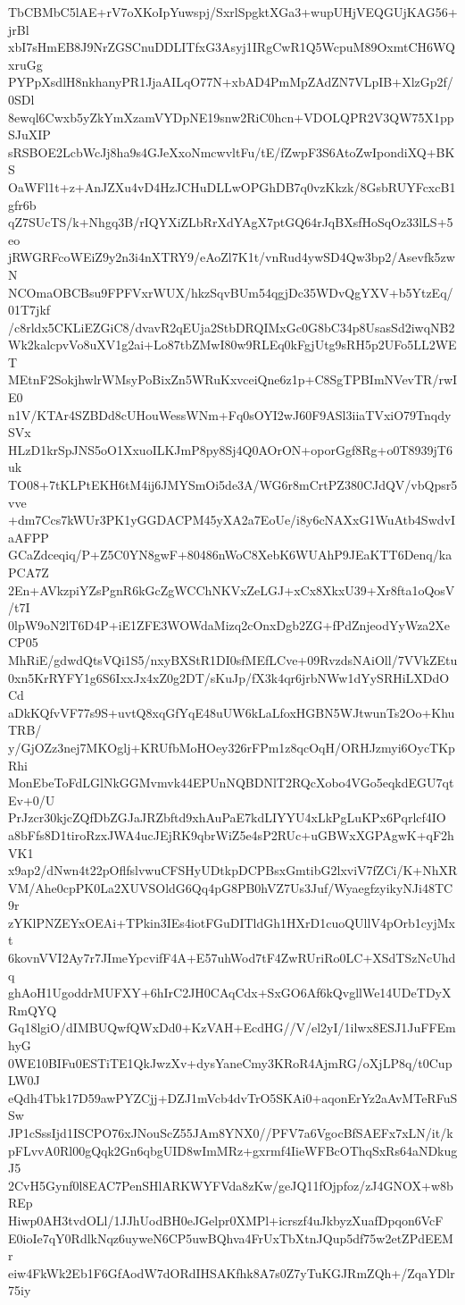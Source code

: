 TbCBMbC5lAE+rV7oXKoIpYuwspj/SxrlSpgktXGa3+wupUHjVEQGUjKAG56+jrBl
xbI7sHmEB8J9NrZGSCnuDDLITfxG3Asyj1IRgCwR1Q5WcpuM89OxmtCH6WQxruGg
PYPpXsdlH8nkhanyPR1JjaAILqO77N+xbAD4PmMpZAdZN7VLpIB+XlzGp2f/0SDl
8ewql6Cwxb5yZkYmXzamVYDpNE19snw2RiC0hcn+VDOLQPR2V3QW75X1ppSJuXIP
sRSBOE2LcbWcJj8ha9s4GJeXxoNmcwvltFu/tE/fZwpF3S6AtoZwIpondiXQ+BKS
OaWFl1t+z+AnJZXu4vD4HzJCHuDLLwOPGhDB7q0vzKkzk/8GsbRUYFcxcB1gfr6b
qZ7SUcTS/k+Nhgq3B/rIQYXiZLbRrXdYAgX7ptGQ64rJqBXsfHoSqOz33lLS+5eo
jRWGRFcoWEiZ9y2n3i4nXTRY9/eAoZl7K1t/vnRud4ywSD4Qw3bp2/Asevfk5zwN
NCOmaOBCBsu9FPFVxrWUX/hkzSqvBUm54qgjDc35WDvQgYXV+b5YtzEq/01T7jkf
/c8rldx5CKLiEZGiC8/dvavR2qEUja2StbDRQIMxGc0G8bC34p8UsasSd2iwqNB2
Wk2kalcpvVo8uXV1g2ai+Lo87tbZMwI80w9RLEq0kFgjUtg9sRH5p2UFo5LL2WET
MEtnF2SokjhwlrWMsyPoBixZn5WRuKxvceiQne6z1p+C8SgTPBImNVevTR/rwIE0
n1V/KTAr4SZBDd8cUHouWessWNm+Fq0sOYI2wJ60F9ASl3iiaTVxiO79TnqdySVx
HLzD1krSpJNS5oO1XxuoILKJmP8py8Sj4Q0AOrON+oporGgf8Rg+o0T8939jT6uk
TO08+7tKLPtEKH6tM4ij6JMYSmOi5de3A/WG6r8mCrtPZ380CJdQV/vbQpsr5vve
+dm7Ccs7kWUr3PK1yGGDACPM45yXA2a7EoUe/i8y6cNAXxG1WuAtb4SwdvIaAFPP
GCaZdceqiq/P+Z5C0YN8gwF+80486nWoC8XebK6WUAhP9JEaKTT6Denq/kaPCA7Z
2En+AVkzpiYZsPgnR6kGcZgWCChNKVxZeLGJ+xCx8XkxU39+Xr8fta1oQosV/t7I
0lpW9oN2lT6D4P+iE1ZFE3WOWdaMizq2cOnxDgb2ZG+fPdZnjeodYyWza2XeCP05
MhRiE/gdwdQtsVQi1S5/nxyBXStR1DI0sfMEfLCve+09RvzdsNAiOll/7VVkZEtu
0xn5KrRYFY1g6S6IxxJx4xZ0g2DT/sKuJp/fX3k4qr6jrbNWw1dYySRHiLXDdOCd
aDkKQfvVF77s9S+uvtQ8xqGfYqE48uUW6kLaLfoxHGBN5WJtwunTs2Oo+KhuTRB/
y/GjOZz3nej7MKOglj+KRUfbMoHOey326rFPm1z8qcOqH/ORHJzmyi6OycTKpRhi
MonEbeToFdLGlNkGGMvmvk44EPUnNQBDNlT2RQcXobo4VGo5eqkdEGU7qtEv+0/U
PrJzcr30kjcZQfDbZGJaJRZbftd9xhAuPaE7kdLIYYU4xLkPgLuKPx6Pqrlcf4IO
a8bFfs8D1tiroRzxJWA4ucJEjRK9qbrWiZ5e4sP2RUc+uGBWxXGPAgwK+qF2hVK1
x9ap2/dNwn4t22pOflfslvwuCFSHyUDtkpDCPBsxGmtibG2lxviV7fZCi/K+NhXR
VM/Ahe0cpPK0La2XUVSOldG6Qq4pG8PB0hVZ7Us3Juf/WyaegfzyikyNJi48TC9r
zYKlPNZEYxOEAi+TPkin3IEs4iotFGuDITldGh1HXrD1cuoQUllV4pOrb1cyjMxt
6kovnVVI2Ay7r7JImeYpcvifF4A+E57uhWod7tF4ZwRUriRo0LC+XSdTSzNcUhdq
ghAoH1UgoddrMUFXY+6hIrC2JH0CAqCdx+SxGO6Af6kQvgllWe14UDeTDyXRmQYQ
Gq18lgiO/dIMBUQwfQWxDd0+KzVAH+EcdHG//V/el2yI/1ilwx8ESJ1JuFFEmhyG
0WE10BIFu0ESTiTE1QkJwzXv+dysYaneCmy3KRoR4AjmRG/oXjLP8q/t0CupLW0J
eQdh4Tbk17D59awPYZCjj+DZJ1mVcb4dvTrO5SKAi0+aqonErYz2aAvMTeRFuSSw
JP1cSssIjd1ISCPO76xJNouScZ55JAm8YNX0//PFV7a6VgocBfSAEFx7xLN/it/k
pFLvvA0Rl00gQqk2Gn6qbgUID8wImMRz+gxrmf4IieWFBcOThqSxRs64aNDkugJ5
2CvH5Gynf0l8EAC7PenSHlARKWYFVda8zKw/geJQ11fOjpfoz/zJ4GNOX+w8bREp
Hiwp0AH3tvdOLl/1JJhUodBH0eJGelpr0XMPl+icrszf4uJkbyzXuafDpqon6VcF
E0ioIe7qY0RdlkNqz6uyweN6CP5uwBQhva4FrUxTbXtnJQup5df75w2etZPdEEMr
eiw4FkWk2Eb1F6GfAodW7dORdIHSAKfhk8A7s0Z7yTuKGJRmZQh+/ZqaYDlr75iy
